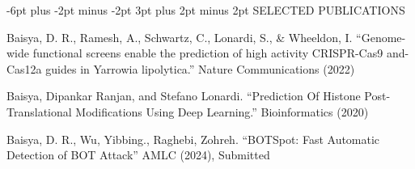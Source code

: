 \documentclass[10pt]{article}
\makeatletter
\providecommand{\tightlist}{%
  \setlength{\itemsep}{0pt}\setlength{\parskip}{0pt}}
\let\olditemize\itemize
\let\endolditemize\enditemize
\renewenvironment{itemize}{%
  \olditemize
  \setlength{\itemsep}{1pt}
  \setlength{\parskip}{0pt}
  \setlength{\parsep}{0pt}
  \setlength{\topsep}{2pt}
  \setlength{\partopsep}{0pt}
}{%
  \endolditemize
}
\renewcommand\subsection{\@startsection{subsection}{2}{\z@}%
  {-6pt plus -2pt minus -2pt}%
  {3pt plus 2pt minus 2pt}%
  {\normalfont\large\bfseries}}
\makeatother
\begin{document}
\subsection{SELECTED PUBLICATIONS}\label{selected-publications}

\begin{itemize}
\tightlist
\item
  Baisya, D. R., Ramesh, A., Schwartz, C., Lonardi, S., \& Wheeldon, I.
  ``Genome-wide functional screens enable the prediction of high
  activity CRISPR-Cas9 and-Cas12a guides in Yarrowia lipolytica.''
  Nature Communications (2022)
\item
  Baisya, Dipankar Ranjan, and Stefano Lonardi. ``Prediction Of Histone
  Post-Translational Modifications Using Deep Learning.'' Bioinformatics
  (2020)
\item
  Baisya, D. R., Wu, Yibbing., Raghebi, Zohreh. ``BOTSpot: Fast
  Automatic Detection of BOT Attack'' AMLC (2024), Submitted
\end{itemize}
\end{document}
